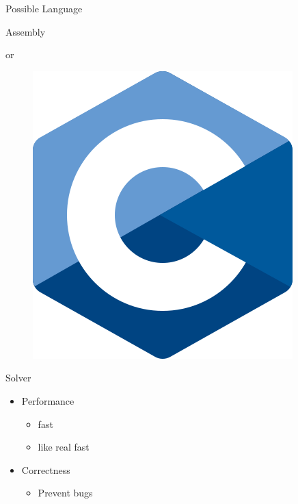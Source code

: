 \documentclass[mathserif,table]{gkibeamer-aaai}
\begin{document}
\begin{frame}{Possible Language}
	\begin{multicols}{2}
		\begin{center}
			\huge{Assembly}
		\end{center}
		\pause
		\begin{center}
			\huge{or}
		\end{center}
		\columnbreak
		\begin{figure}[ht]
			\includegraphics[scale=0.2]{./figures/c_logo.png}
		\end{figure}
	\end{multicols}
\end{frame}

\begin{frame}{Solver}
	\begin{itemize}
		\item Performance
		      \begin{itemize}
			      \item fast
			      \item like real fast
		      \end{itemize}
		      \pause
		\item Correctness
		      \begin{itemize}
			      \item Prevent bugs
		      \end{itemize}
	\end{itemize}
\end{frame}
\end{document}
